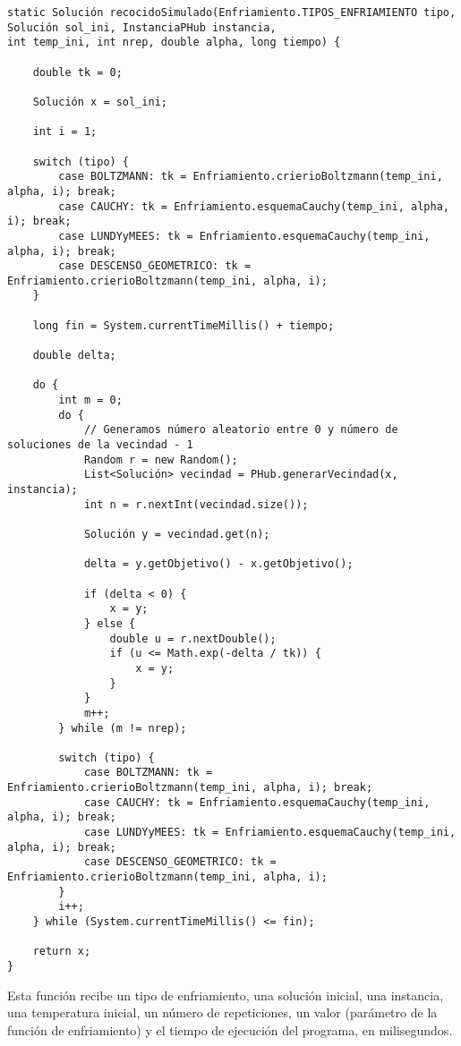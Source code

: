 \documentclass[12pt,a4paper,twoside,openright,titlepage,final]{article}
\begin{document}
\begin{verbatim}
static Solución recocidoSimulado(Enfriamiento.TIPOS_ENFRIAMIENTO tipo, Solución sol_ini, InstanciaPHub instancia,
int temp_ini, int nrep, double alpha, long tiempo) {

    double tk = 0;

    Solución x = sol_ini;

    int i = 1;

    switch (tipo) {
        case BOLTZMANN: tk = Enfriamiento.crierioBoltzmann(temp_ini, alpha, i); break;
        case CAUCHY: tk = Enfriamiento.esquemaCauchy(temp_ini, alpha, i); break;
        case LUNDYyMEES: tk = Enfriamiento.esquemaCauchy(temp_ini, alpha, i); break;
        case DESCENSO_GEOMETRICO: tk = Enfriamiento.crierioBoltzmann(temp_ini, alpha, i);
    }

    long fin = System.currentTimeMillis() + tiempo;

    double delta;

    do {
        int m = 0;
        do {
            // Generamos número aleatorio entre 0 y número de soluciones de la vecindad - 1
            Random r = new Random();
            List<Solución> vecindad = PHub.generarVecindad(x, instancia);
            int n = r.nextInt(vecindad.size());

            Solución y = vecindad.get(n);

            delta = y.getObjetivo() - x.getObjetivo();

            if (delta < 0) {
                x = y;
            } else {
                double u = r.nextDouble();
                if (u <= Math.exp(-delta / tk)) {
                    x = y;
                }
            }
            m++;
        } while (m != nrep);
        
        switch (tipo) {
            case BOLTZMANN: tk = Enfriamiento.crierioBoltzmann(temp_ini, alpha, i); break;
            case CAUCHY: tk = Enfriamiento.esquemaCauchy(temp_ini, alpha, i); break;
            case LUNDYyMEES: tk = Enfriamiento.esquemaCauchy(temp_ini, alpha, i); break;
            case DESCENSO_GEOMETRICO: tk = Enfriamiento.crierioBoltzmann(temp_ini, alpha, i);
        }
        i++;
    } while (System.currentTimeMillis() <= fin);

    return x;
}
\end{verbatim}

Esta función recibe un tipo de enfriamiento, una solución inicial, una instancia, una temperatura inicial, un número de repeticiones, un valor (parámetro de la función de enfriamiento) y el tiempo de ejecución del programa, en milisegundos.\\
\end{document}
